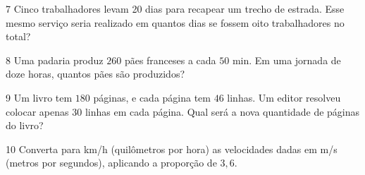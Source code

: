 

\bigskip

\num{7} Cinco trabalhadores levam 20 dias para recapear um trecho de estrada. Esse
mesmo serviço seria realizado em quantos dias se fossem oito trabalhadores no
total?

\bigskip







\bigskip

\num{8} Uma padaria produz $260$ pães franceses a cada $50$ min. Em uma jornada
de doze horas, quantos pães são produzidos?

\bigskip





\bigskip

\num{9} Um livro tem $180$ páginas, e cada página tem $46$ linhas. Um editor
resolveu colocar apenas $30$ linhas em cada página. Qual será a nova
quantidade de páginas do livro?

\bigskip






\bigskip

\num{10} Converta para km/h (quilômetros por hora) as velocidades
dadas em m/s (metros por segundos), aplicando a proporção de $3,6$.

